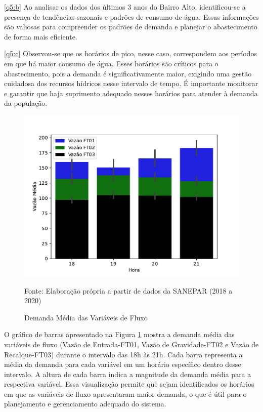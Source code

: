\ref{q5:b} Ao analisar os dados dos últimos 3 anos do Bairro Alto, identificou-se a presença de tendências sazonais e padrões de consumo de água. Essas informações são valiosas para compreender os padrões de demanda e planejar o abastecimento de forma mais eficiente.

\ref{q5:c} Observou-se que os horários de pico, nesse caso, correspondem aos períodos em que há maior consumo de água. Esses horários são críticos para o abastecimento, pois a demanda é significativamente maior, exigindo uma gestão cuidadosa dos recursos hídricos nesse intervalo de tempo. É importante monitorar e garantir que haja suprimento adequado nesses horários para atender à demanda da população.



\begin{figure}[H]
	\centering
	\caption{Demanda Média das Variáveis de Fluxo}
	\includegraphics[width=0.9\linewidth]{Resultados/Figuras/grafico-barras-demanda}
	
	\label{fig:grafico-barras-demanda}
	
	Fonte: Elaboração própria a partir de dados da SANEPAR (2018 a 2020)
\end{figure}

O gráfico de barras apresentado na Figura \ref{fig:grafico-barras-demanda} mostra a demanda média das variáveis de fluxo (Vazão de Entrada-FT01, Vazão de Gravidade-FT02 e Vazão de Recalque-FT03) durante o intervalo das 18h às 21h. Cada barra representa a média da demanda para cada variável em um horário específico dentro desse intervalo. A altura de cada barra indica a magnitude da demanda média para a respectiva variável. Essa visualização permite que sejam identificados os horários em que as variáveis de fluxo apresentaram maior demanda, o que é útil para o planejamento e gerenciamento adequado do sistema.

